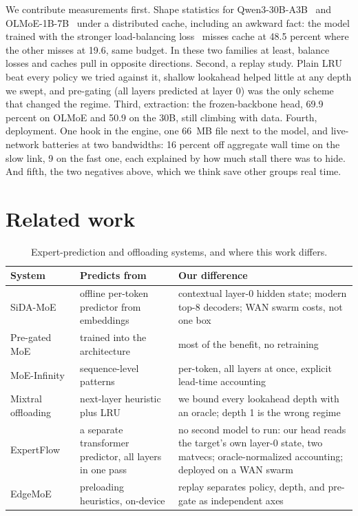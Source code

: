 \documentclass[11pt]{article}
\begin{document}
We contribute measurements first. Shape statistics for Qwen3-30B-A3B~\citep{qwen3} and OLMoE-1B-7B~\citep{olmoe} under a distributed cache, including an awkward fact: the model trained with the stronger load-balancing loss~\citep{switch,gshard} misses cache at 48.5 percent where the other misses at 19.6, same budget. In these two families at least, balance losses and caches pull in opposite directions. Second, a replay study. Plain LRU beat every policy we tried against it, shallow lookahead helped little at any depth we swept, and pre-gating (all layers predicted at layer 0) was the only scheme that changed the regime. Third, extraction: the frozen-backbone head, 69.9 percent on OLMoE and 50.9 on the 30B, still climbing with data. Fourth, deployment. One hook in the engine, one 66~MB file next to the model, and live-network batteries at two bandwidths: 16 percent off aggregate wall time on the slow link, 9 on the fast one, each explained by how much stall there was to hide. And fifth, the two negatives above, which we think save other groups real time.

\section{Related work}
\begin{table}[h]
\centering\small
\begin{tabular}{p{2.5cm}p{4.2cm}p{7.2cm}}
\toprule
System & Predicts from & Our difference \\
\midrule
SiDA-MoE~\citep{sida} & offline per-token predictor from embeddings & contextual layer-0 hidden state; modern top-8 decoders; WAN swarm costs, not one box \\
Pre-gated MoE~\citep{pregated} & trained into the architecture & most of the benefit, no retraining \\
MoE-Infinity~\citep{moeinfinity} & sequence-level patterns & per-token, all layers at once, explicit lead-time accounting \\
Mixtral offloading~\citep{mixtraloffload} & next-layer heuristic plus LRU & we bound every lookahead depth with an oracle; depth 1 is the wrong regime \\
ExpertFlow~\citep{expertflow} & a separate transformer predictor, all layers in one pass & no second model to run: our head reads the target's own layer-0 state, two matvecs; oracle-normalized accounting; deployed on a WAN swarm \\
EdgeMoE~\citep{edgemoe} & preloading heuristics, on-device & replay separates policy, depth, and pre-gate as independent axes \\
\bottomrule
\end{tabular}
\caption{Expert-prediction and offloading systems, and where this work differs.}
\end{table}
\end{document}
